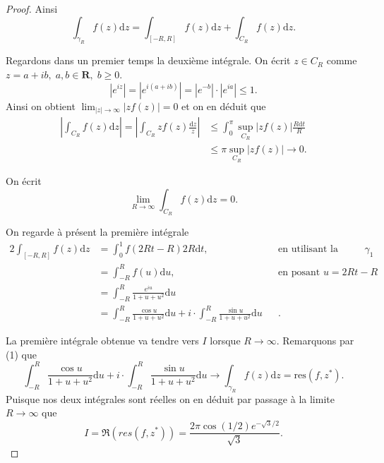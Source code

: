 \documentclass[12pt]{article}
\newcommand{\R}{\mathbf{R}}
\newcommand{\de}{\mathrm{d}}
\begin{document}
\begin{proof}
        Ainsi
        \[
                \int_{\gamma_{R}}f(z) \de z = \int_{[-R, R]}f(z) \de z + \int_{C_{R}}f(z)\de z 
        .\] 
        
        Regardons dans un premier temps la deuxième intégrale. On écrit $z \in C_{R}$ comme $z = a + ib, \; a, b \in \R, \; b \ge 0$. \[
                |e^{iz}| = |e^{i(a+ib)}| = |e^{-b}|\cdot|e^{ia}| \le 1
        .\]
        Ainsi on obtient $\lim_{|z| \to \infty} |zf(z)| = 0$ et on en déduit que 
        \begin{align*}
                |\int_{C_{R}}f(z)\de z| = |\int_{C_{R}}zf(z) \frac{\de z}{z}| &\le \int_{0}^{\pi} \sup_{C_{R}}|zf(z)| \frac{R\de t}{R} \\
                                                                              &\le \pi\sup_{C_{R}}|zf(z)| \to 0
        .\end{align*}
        
        On écrit
        \begin{equation}
                \lim_{R \to \infty} \int_{C_{R}}f(z)\de z = 0.
        \end{equation}

        On regarde à présent la première intégrale
        \begin{alignat*}{2}
                \int_{[-R, R]}f(z)\de z &= \int_{0}^{1}f(2Rt-R)2R \de t, &&\text{en utilisant la paramétrisation } \gamma_1 \\
                                        &= \int_{-R}^{R}f(u)\de u, &&\text{en posant } u = 2Rt - R \\
                                        &= \int_{-R}^{R}\frac{e^{iu}}{1+u+u^{2}}\de u &&\\
                                        &= \int_{-R}^{R}\frac{\cos u}{1+u+u^{2}} \de u + i\cdot\int_{-R}^{R}\frac{\sin u}{1+u+u^{2}} \de u &&
        .\end{alignat*}

        La première intégrale obtenue va tendre vers $I$ lorsque $R \to \infty$. Remarquons par (1) que \[
                \int_{-R}^{R}\frac{\cos u}{1+u+u^{2}} \de u + i\cdot\int_{-R}^{R}\frac{\sin u}{1+u+u^{2}} \de u \to \int_{\gamma_{R}}f(z) \de z = \mathrm{res}(f, z^{*}) 
        .\] 
        Puisque nos deux intégrales sont réelles on en déduit par passage à la limite $R \to \infty$ que 
        \[
        I = \Re({res(f, z^{*})}) = \frac{2\pi\cos(1/2)e^{-\sqrt{3}/2}}{\sqrt{3}}
       .\] 
\end{proof}
\end{document}
